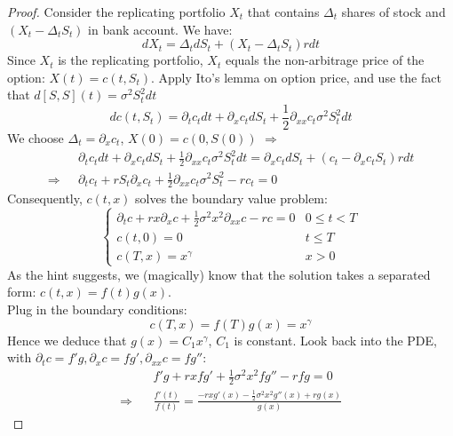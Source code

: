 \documentclass[a4paper, 10pt]{article}
\theoremstyle{definition}
\theoremstyle{hSol}
\begin{document}
\begin{proof} Consider the replicating portfolio $X_t$ that contains $\Delta_t$ shares of stock and $(X_t - \Delta_t S_t)$ in bank account. We have:
\begin{equation}
	dX_t = \Delta_t dS_t + (X_t - \Delta_t S_t)rdt
\end{equation}
Since $X_t$ is the replicating portfolio, $X_t$ equals the non-arbitrage price of the option: $X(t) = c(t,S_t)$. Apply Ito's lemma on option price, and use the fact that $d[S,S](t)=\sigma^2S_t^2dt$
$$
dc(t,S_t) = \partial_t c_tdt + \partial_x c_tdS_t + \frac{1}{2}\partial_{xx}c_t \sigma^2S_t^2 dt
$$
We choose $\Delta_t = \partial_x c_t$, $X(0) = c(0,S(0))$ $\Rightarrow$
\begin{equation}
	\begin{split}
		&\partial_t c_tdt + \partial_x c_tdS_t + \frac{1}{2}\partial_{xx}c_t \sigma^2S_t^2 dt = \partial_xc_t dS_t + (c_t - \partial_xc_t S_t)rdt \\
		\Rightarrow ~~~&\partial_t c_t + rS_t\partial_x c_t + \frac{1}{2}\partial_{xx}c_t \sigma^2 S_t^2 - rc_t = 0
	\end{split}
\end{equation}
Consequently, $c(t,x)$ solves the boundary value problem:
\begin{equation}
	\begin{cases}
	\partial_t c + rx\partial_x c + \frac{1}{2}\sigma^2 x^2\partial_{xx}c  - rc = 0 & 0\leq t < T\\
	c(t,0) = 0 & t\leq T \\
	c(T,x) = x^{\gamma} &x > 0
	\end{cases}
\end{equation}
As the hint suggests, we (magically) know that the solution takes a separated form: $c(t,x) = f(t)g(x)$. \\
Plug in the boundary conditions:
\begin{equation}
	c(T,x) = f(T) g(x) = x^{\gamma}
\end{equation}
Hence we deduce that $g(x) = C_1 x^{\gamma}$, $C_1$ is constant. Look back into the PDE, with $\partial_t c = f'g, \partial_x c = fg', \partial_{xx}c = fg''$:
\begin{equation}
	\begin{split}
		&f'g + rx fg' + \frac{1}{2}\sigma^2 x^2 fg'' - rfg = 0 \\
		\Rightarrow ~~~~&\frac{f'(t)}{f(t)} = \frac{-rxg'(x) - \frac{1}{2}\sigma^2 x^2 g''(x) + rg(x)}{g(x)}
	\end{split}
\end{equation}

\end{proof}
\end{document}
